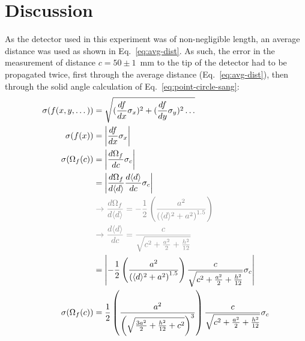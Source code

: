 \documentclass[12pt]{article}
\begin{document}
\section{Discussion}\label{sec:disc}
As the detector used in this experiment was of non-negligible length, an average distance was used as shown in Eq.~\ref{eq:avg-dist}.
As such, the error in the measurement of distance $c=50\pm1$~mm to the tip of the detector had to be propagated twice, first through the average distance (Eq.~\ref{eq:avg-dist}), then through the solid angle calculation of Eq.~\ref{eq:point-circle-sang}:
\begin{gather}
    \label{eq:sang-err-rederiv}
    \begin{aligned}
        \sigma(f(x,y,\dots))&=\sqrt{(\frac{df}{dx} \sigma_x)^2 + (\frac{df}{dy} \sigma_y)^2 \dots}\\
        \sigma(f(x))&=\left|\frac{df}{dx} \sigma_x\right|\\
        \sigma(\Omega_f(c))&=\left|\frac{d\Omega_f}{dc}\sigma_c\right|\\
        &=\left|\frac{d\Omega_f}{d\avd}\frac{d\avd}{dc}\sigma_c\right|\\
        &\color{gray}\rightarrow\frac{d\Omega_f}{d\avd}=-\frac{1}{2}\left(\frac{a^{2}}{\left(\avd^{2}+a^{2}\right)^{1.5}}\right)\\
        &\color{gray}\rightarrow\frac{d\avd}{dc}=\frac{c}{\sqrt{c^{2}+\frac{a^{2}}{2}+\frac{h^{2}}{12}}}\\
        &=\left|-\frac{1}{2}\left(\frac{a^{2}}{\left(\avd^{2}+a^{2}\right)^{1.5}}\right)\frac{c}{\sqrt{c^{2}+\frac{a^{2}}{2}+\frac{h^{2}}{12}}}\sigma_c\right|\\
        \sigma(\Omega_f(c))&=\frac{1}{2}\left(\frac{a^{2}}{\left(\sqrt{\frac{3a^{2}}{2}+\frac{h^{2}}{12}+c^{2}}\right)^{3}}\right)\frac{c}{\sqrt{c^{2}+\frac{a^{2}}{2}+\frac{h^{2}}{12}}}\sigma_c
    \end{aligned}
\end{gather}
\end{document}
